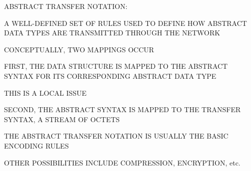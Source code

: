 

\begin{bwslide}

\begin{nrtc}
\item	ABSTRACT TRANSFER NOTATION:
    \begin{nrtc}
    \item	A WELL-DEFINED SET OF RULES USED TO DEFINE HOW ABSTRACT DATA
		TYPES ARE TRANSMITTED THROUGH THE NETWORK
    \end{nrtc}
\end{nrtc}
\end{bwslide}


\begin{bwslide}

\begin{nrtc}
\item	CONCEPTUALLY, TWO MAPPINGS OCCUR

\item	FIRST, THE DATA STRUCTURE IS MAPPED TO THE ABSTRACT SYNTAX FOR ITS
	CORRESPONDING ABSTRACT DATA TYPE
    \begin{nrtc}
    \item	THIS IS A LOCAL ISSUE
    \end{nrtc}

\item	SECOND, THE ABSTRACT SYNTAX IS MAPPED TO THE TRANSFER SYNTAX,
	A STREAM OF OCTETS
    \begin{nrtc}
    \item	THE ABSTRACT TRANSFER NOTATION IS USUALLY THE BASIC ENCODING
		RULES

    \item	OTHER POSSIBILITIES INCLUDE COMPRESSION, ENCRYPTION, etc.
    \end{nrtc}
\end{nrtc}
\end{bwslide}


